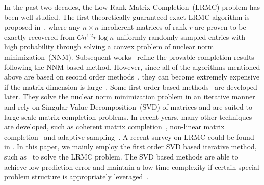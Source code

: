In the past two decades, the Low-Rank Matrix Completion~(LRMC) problem has been well studied. The first theoretically guaranteed exact LRMC algorithm is proposed in~\cite{candes2009exact}, where any $n \times n$ incoherent matrices of rank $r$ are proven to be exactly recovered from $C n^{1.2}r\log n$ uniformly randomly sampled entries with high probability through solving a convex problem of nuclear norm minimization~(NNM). Subsequent works~\cite{candes2010power, chen2015incoherence, gross2011recovering, recht2011simpler} refine the provable completion results following the NNM based method. However, since all of the algorithms mentioned above are based on second order methods~\cite{liu2010interior}, they can become extremely expensive if the matrix dimension is large~\cite{cai2010singular}. Some first order based methods~\cite{cai2010singular, ji2009accelerated, mazumder2010spectral} are developed later. They solve the nuclear norm minimization problem in an iterative manner and rely on Singular Value Decomposition~(SVD) of matrices and are suited to large-scale matrix completion problems. In recent years, many other techniques are developed, such as coherent matrix completion~\cite{liu2017new, bhojanapalli2014universal, chen2014coherent}, non-linear matrix completion~\cite{eriksson2012high} and adaptive sampling~\cite{chen2015completing, eftekhari2018mc2}. {\color{black}A recent survey on LRMC could be found in \cite{nguyen2019low}.}
In this paper, we mainly employ the first order SVD based iterative method, such as~\cite{mazumder2010spectral} to solve the LRMC problem. {\color{black} The SVD based methods are able to achieve low prediction error and maintain a low time complexity if certain special problem structure is appropriately leveraged~\cite{mazumder2010spectral}.}
